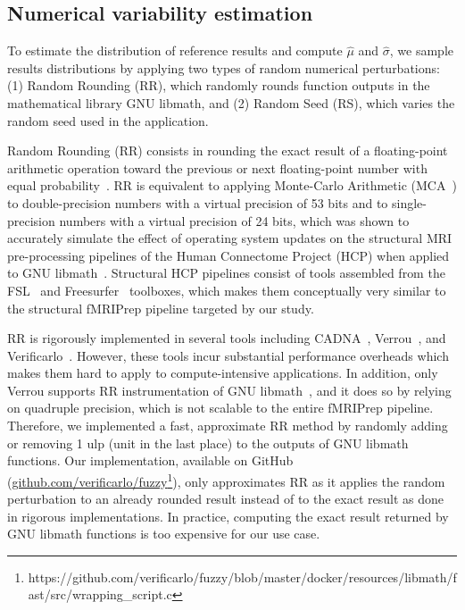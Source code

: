 \documentclass{article}
\begin{document}
\subsection{Numerical variability estimation}

To estimate the distribution of reference results and compute $\hat \mu$ and $\hat \sigma$, we sample results distributions by applying two types of random numerical perturbations: (1) Random Rounding (RR), which randomly rounds function outputs in the mathematical library GNU libmath, and (2) Random Seed (RS), which varies the random seed used in the application.

Random Rounding (RR) consists in rounding the exact result of a floating-point arithmetic operation toward the previous or next floating-point number with equal probability~\cite{forsythe1959reprint}. RR is equivalent to applying Monte-Carlo Arithmetic (MCA~\cite{parker1997monte}) to double-precision numbers with a virtual precision of 53 bits and to single-precision numbers with a virtual precision of 24 bits, which was shown to accurately simulate the effect of operating system updates on the structural MRI pre-processing pipelines of the Human Connectome Project (HCP) when applied to GNU libmath~\cite{salari2021accurate}. Structural HCP pipelines consist of tools assembled from the FSL~\cite{jenkinson2012fsl} and Freesurfer~\cite{fischl2012freesurfer} toolboxes, which makes them conceptually very similar to the structural fMRIPrep pipeline targeted by our study.

RR is rigorously implemented in several tools including CADNA~\cite{jezequel2008cadna}, Verrou~\cite{fevotte2016verrou}, and Verificarlo~\cite{denis2016verificarlo}. However, these tools incur substantial performance overheads which makes them hard to apply to compute-intensive applications. In addition, only Verrou supports RR instrumentation of GNU libmath~\cite{fevotte2019debugging}, and it does so by relying on quadruple precision, which is not scalable to the entire fMRIPrep pipeline. Therefore, we implemented a fast, approximate RR method by randomly adding or removing 1 ulp (unit in the last place) to the outputs of GNU libmath functions. Our implementation, available on GitHub (\href{https://github.com/verificarlo/fuzzy/blob/master/docker/resources/libmath/fast/src/wrapping_script.c}{\url{github.com/verificarlo/fuzzy}}\footnote{https://github.com/verificarlo/fuzzy/blob/master/docker/resources/libmath/fast/src/wrapping\_script.c}),  only approximates RR as it applies the random perturbation to an already rounded result instead of to the exact result as done in rigorous implementations. In practice, computing the exact result returned by GNU libmath functions is too expensive for our use case.
\end{document}
